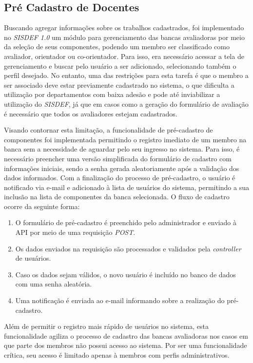 \documentclass[nonacm, sigconf]{acmart}
\begin{document}
\subsection{Pré Cadastro de Docentes}
\label{section:pre-register-development}

Buscando agregar informações sobre os trabalhos cadastrados, foi implementado no \textit{SISDEF 1.0} um módulo para gerenciamento das bancas avaliadoras por meio da seleção de seus componentes, podendo um membro ser classificado como avaliador, orientador ou co-orientador. Para isso, era necessário acessar a tela de gerenciamento e buscar pelo usuário a ser adicionado, selecionando também o perfil desejado. No entanto, uma das restrições para esta tarefa é que o membro a ser associado deve estar previamente cadastrado no sistema, o que dificulta a utilização por departamentos com baixa adesão e pode até inviabilizar a utilização do \textit{SISDEF}, já que em casos como a geração do formulário de avaliação é necessário que todos os avaliadores estejam cadastrados.

Visando contornar esta limitação, a funcionalidade de pré-cadastro de componentes foi implementada permitindo o registro imediato de um membro na banca sem a necessidade de aguardar pelo seu ingresso no sistema. Para isso, é necessário preencher uma versão simplificada do formulário de cadastro com informações iniciais, sendo a senha gerada aleatoriamente após a validação dos dados informados. Com a finalização do processo de pré-cadastro, o usuário é notificado via e-mail e adicionado à lista de usuários do sistema, permitindo a sua inclusão na lista de componentes da banca selecionada. O fluxo de cadastro ocorre da seguinte forma:

\begin{enumerate}
  \item O formulário de pré-cadastro é preenchido pelo administrador e enviado à API por meio de uma requisição \textit{POST}.
  \item Os dados enviados na requisição são processados e validados pela \textit{controller} de usuários.
  \item Caso os dados sejam válidos, o novo usuário é incluído no banco de dados com uma senha aleatória.
  \item Uma notificação é enviada ao e-mail informando sobre a realização do pré-cadastro.
\end{enumerate}

Além de permitir o registro mais rápido de usuários no sistema, esta funcionalidade agiliza o processo de cadastro das bancas avaliadoras nos casos em que parte dos membros não possui acesso ao sistema. Por ser uma funcionalidade crítica, seu acesso é limitado apenas à membros com perfis administrativos.
\end{document}
